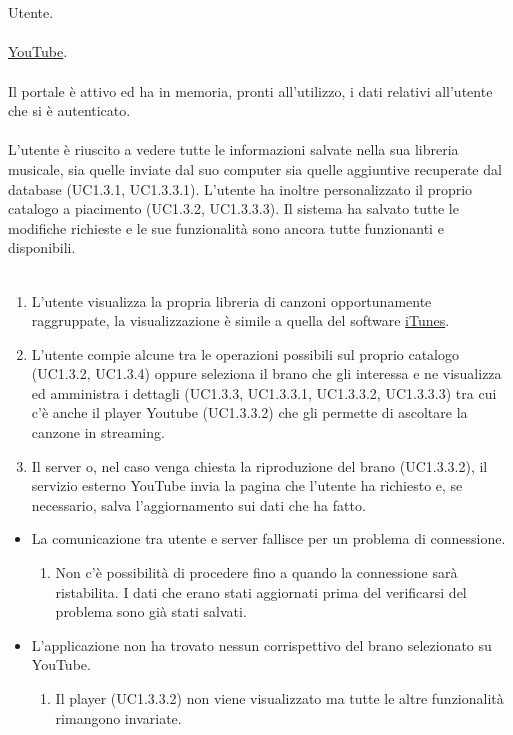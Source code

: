 \vspace*{0.5cm}
 \\\\
 Utente. \\\\
 \underline{YouTube}. \\\\
 Il portale \`e attivo ed ha in memoria, pronti all'utilizzo,
i dati relativi all'utente che si \`e autenticato.  \\\\ 
 L'utente \`e riuscito a vedere tutte le informazioni
salvate nella sua libreria musicale, sia quelle inviate dal suo computer sia
quelle aggiuntive recuperate dal database (UC1.3.1, UC1.3.3.1). L'utente ha
inoltre personalizzato il proprio catalogo a piacimento (UC1.3.2, UC1.3.3.3).
Il sistema ha salvato tutte le modifiche richieste e le sue funzionalit\`a sono
ancora tutte funzionanti e disponibili. \\\\
\begin{enumerate}
  \item L'utente visualizza la propria libreria di canzoni
  opportunamente raggruppate, la visualizzazione \`e simile a quella
  del software \underline{iTunes}.
  \item L'utente compie alcune tra le operazioni possibili sul proprio
  catalogo (UC1.3.2, UC1.3.4) oppure seleziona il brano che gli interessa e ne
  visualizza ed amministra i dettagli (UC1.3.3, UC1.3.3.1, UC1.3.3.2, UC1.3.3.3)
  tra cui c'\`e anche il player Youtube (UC1.3.3.2) che gli permette di
  ascoltare la canzone in streaming.
  \item Il server o, nel caso venga chiesta la riproduzione del brano (UC1.3.3.2), il
  servizio esterno YouTube invia la pagina che l'utente ha richiesto e, se
  necessario, salva l'aggiornamento sui dati che ha fatto.
\end{enumerate}
\begin{itemize}
  \item La comunicazione tra utente e server fallisce per un problema di
  connessione.
  \begin {enumerate}
    \item Non c'\`e possibilit\`a di procedere fino a quando la connessione sar\`a
    ristabilita. I dati che erano stati aggiornati prima del verificarsi del
    problema sono gi\`a stati salvati.
  \end{enumerate}
  \item L'applicazione non ha trovato nessun corrispettivo del brano
  selezionato su YouTube.
  \begin {enumerate}
    \item Il player (UC1.3.3.2) non viene visualizzato ma tutte le altre
    funzionalit\`a rimangono invariate.
  \end{enumerate}
\end{itemize}
\newpage



